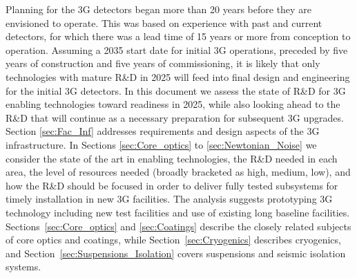 

Planning for the 3G detectors began more than 20 years before they are envisioned to operate. 
This was based on experience with past and current detectors, for which there was a lead time of 15 years or more from conception to operation. 
Assuming a 2035 start date for initial 3G operations, preceded by five years of construction and five years of commissioning, it is likely that only technologies with mature R\&D in 2025 will feed into final design and engineering for the initial 3G detectors. In this document we assess the state of R\&D for 3G enabling technologies toward readiness in 2025, while also looking ahead to the R\&D that will continue as a necessary preparation for subsequent 3G upgrades. 
Section \ref{sec:Fac_Inf} addresses requirements and design aspects of the 3G infrastructure.
In Sections \ref{sec:Core_optics} to \ref{sec:Newtonian_Noise} we consider the state of the art in enabling technologies, the R\&D needed in each area, the level of resources needed (broadly bracketed as high, medium, low), and how the R\&D should be focused in order to deliver fully tested subsystems for timely installation in new 3G facilities. 
The analysis suggests prototyping 3G technology including new test facilities and use of existing long baseline facilities. 
Sections~\ref{sec:Core_optics} and \ref{sec:Coatings} describe the closely related subjects of core optics and coatings, while Section~\ref{sec:Cryogenics} describes cryogenics, and Section~\ref{sec:Suspensions_Isolation} covers suspensions and seismic isolation systems.
